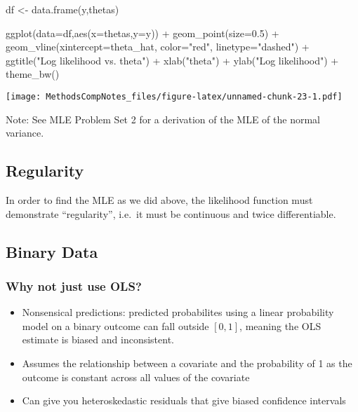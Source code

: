 \documentclass[
]{article}
\newenvironment{Shaded}{\begin{snugshade}}{\end{snugshade}}
\newcommand{\AttributeTok}[1]{\textcolor[rgb]{0.77,0.63,0.00}{#1}}
\newcommand{\FloatTok}[1]{\textcolor[rgb]{0.00,0.00,0.81}{#1}}
\newcommand{\FunctionTok}[1]{\textcolor[rgb]{0.00,0.00,0.00}{#1}}
\newcommand{\NormalTok}[1]{#1}
\newcommand{\OtherTok}[1]{\textcolor[rgb]{0.56,0.35,0.01}{#1}}
\newcommand{\SpecialCharTok}[1]{\textcolor[rgb]{0.00,0.00,0.00}{#1}}
\newcommand{\StringTok}[1]{\textcolor[rgb]{0.31,0.60,0.02}{#1}}
\providecommand{\tightlist}{%
  \setlength{\itemsep}{0pt}\setlength{\parskip}{0pt}}
\begin{document}
\begin{Shaded}
\begin{Highlighting}[]
\NormalTok{df }\OtherTok{\textless{}{-}} \FunctionTok{data.frame}\NormalTok{(y,thetas)}

\FunctionTok{ggplot}\NormalTok{(}\AttributeTok{data=}\NormalTok{df,}\FunctionTok{aes}\NormalTok{(}\AttributeTok{x=}\NormalTok{thetas,}\AttributeTok{y=}\NormalTok{y)) }\SpecialCharTok{+}
  \FunctionTok{geom\_point}\NormalTok{(}\AttributeTok{size=}\FloatTok{0.5}\NormalTok{) }\SpecialCharTok{+}
  \FunctionTok{geom\_vline}\NormalTok{(}\AttributeTok{xintercept=}\NormalTok{theta\_hat, }\AttributeTok{color=}\StringTok{"red"}\NormalTok{, }\AttributeTok{linetype=}\StringTok{"dashed"}\NormalTok{) }\SpecialCharTok{+}
  \FunctionTok{ggtitle}\NormalTok{(}\StringTok{"Log likelihood vs. theta"}\NormalTok{) }\SpecialCharTok{+}
  \FunctionTok{xlab}\NormalTok{(}\StringTok{"theta"}\NormalTok{) }\SpecialCharTok{+}
  \FunctionTok{ylab}\NormalTok{(}\StringTok{"Log likelihood"}\NormalTok{) }\SpecialCharTok{+}
  \FunctionTok{theme\_bw}\NormalTok{()}
\end{Highlighting}
\end{Shaded}

\texttt{[image: MethodsCompNotes\_files/figure-latex/unnamed-chunk-23-1.pdf]}

Note: See MLE Problem Set 2 for a derivation of the MLE of the normal
variance.

\hypertarget{regularity}{%
\subsection{Regularity}\label{regularity}}

In order to find the MLE as we did above, the likelihood function must
demonstrate ``regularity'', i.e.~it must be continuous and twice
differentiable.

\hypertarget{binary-data}{%
\subsection{Binary Data}\label{binary-data}}

\hypertarget{why-not-just-use-ols}{%
\subsubsection{Why not just use OLS?}\label{why-not-just-use-ols}}

\begin{itemize}
\tightlist
\item
  Nonsensical predictions: predicted probabilites using a linear
  probability model on a binary outcome can fall outside \([0,1]\),
  meaning the OLS estimate is biased and inconsistent.
\item
  Assumes the relationship between a covariate and the probability of 1
  as the outcome is constant across all values of the covariate
\item
  Can give you heteroskedastic residuals that give biased confidence
  intervals
\end{itemize}
\end{document}
